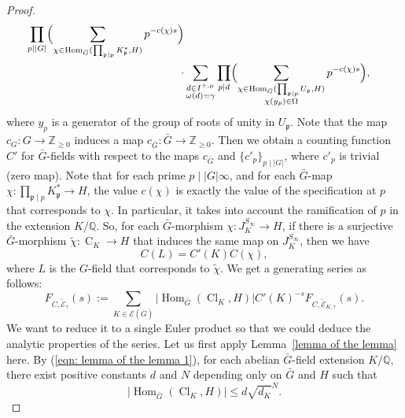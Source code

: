 \documentclass{amsart}
\numberwithin{equation}{section}
\theoremstyle{plain}
\theoremstyle{definition}
\theoremstyle{remark}
\begin{document}
\begin{proof}
\begin{equation*}
\begin{aligned}
			\prod_{p\mid\lvert G\rvert}\Bigl(
			\sum_{\chi\in\operatorname{Hom}_{\bar{G}}(\prod_{\mathfrak{p}\mid p}K_{\mathfrak{p}}^*,H)}p^{-c(\chi)s}
			\Bigr)
			\\
			\cdot&\sum_{
				\substack{
					d\in I^{+,\mu}\\
					\omega(d)=\gamma
				}
			}
			\prod_{p\mid d}
			\Bigl(\sum_{
				\substack{
					\chi\in\operatorname{Hom}_{\bar{G}}(\prod_{\mathfrak{p}\mid p}U_{\mathfrak{p}},H)\\
					\chi(y_p)\in\Omega
				}			
			}p^{-c(\chi)s}\Bigr),
		\end{aligned}
	\end{equation*}
	where $y_p$ is a generator of the group of roots of unity in $U_{\mathfrak{p}}$.
	Note that the map $c_G:G\to\mathbb{Z}_{\geq0}$ induces a map $c_{\bar{G}}:\bar{G}\to\mathbb{Z}_{\geq0}$.
	Then we obtain a counting function $C'$ for $\bar{G}$-fields with respect to the maps $c_{\bar{G}}$ and $\{c'_p\}_{p\mid\lvert G\rvert}$, where $c'_p$ is trivial (zero map).
	Note that for each prime $p\mid\lvert G\rvert\infty$, and for each $\bar{G}$-map $\chi:\prod_{\mathfrak{p}\mid p}K_{\mathfrak{p}}^*\to H$, the value $c(\chi)$ is exactly the value of the specification at $p$ that corresponds to $\chi$.
	In particular, it takes into account the ramification of $p$ in the extension $K/\mathbb{Q}$.
	So, for each $\bar{G}$-morphism $\chi:J_K^{S_\infty}\to H$, if there is a surjective $\bar{G}$-morphism $\tilde{\chi}:\operatorname{C}_K\to H$ that induces the same map on $J_K^{S_\infty}$, then we have
	\begin{equation*}
		C(L)=C'(K)C(\chi),
	\end{equation*}
	where $L$ is the $G$-field that corresponds to $\tilde{\chi}$.
	We get a generating series as follows:
	\begin{equation*}
		F_{C,\tilde{\mathcal{E}}_{\gamma}}(s):=\sum_{K\in\mathcal{E}(\bar{G})}\lvert\operatorname{Hom}_{\bar{G}}(\operatorname{Cl}_K,H)\rvert C'(K)^{-s}F_{C,\tilde{\mathcal{E}}_{K,\gamma}}(s).
	\end{equation*}
	We want to reduce it to a single Euler product so that we could deduce the analytic properties of the series.
	Let us first apply Lemma~\ref{lemma of the lemma} here.
	By (\ref{eqn: lemma of the lemma 1}), for each abelian $\bar{G}$-field extension $K/\mathbb{Q}$, there exist positive constants $d$ and $N$ depending only on $\bar{G}$ and $H$ such that 
	\begin{equation*}
		\lvert\operatorname{Hom}_{\bar{G}}(\operatorname{Cl}_K,H)\rvert\leq d\sqrt{d_K}^N.

\end{equation*}
\end{proof}
\end{document}

